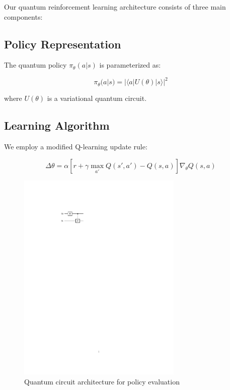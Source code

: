 Our quantum reinforcement learning architecture consists of three main components:

\subsection{Policy Representation}
The quantum policy $\pi_\theta(a|s)$ is parameterized as:

\begin{equation}
    \pi_\theta(a|s) = |\langle a|U(\theta)|s\rangle|^2
\end{equation}

where $U(\theta)$ is a variational quantum circuit.

\subsection{Learning Algorithm}
We employ a modified Q-learning update rule:

\begin{equation}
    \Delta\theta = \alpha[r + \gamma\max_{a'}Q(s',a') - Q(s,a)]\nabla_\theta Q(s,a)
\end{equation}

\begin{figure}[h]
    \centering
    \includegraphics[width=0.7\textwidth]{figures/circuit_diagram}
    \caption{Quantum circuit architecture for policy evaluation}
    \label{fig:circuit}
\end{figure}
